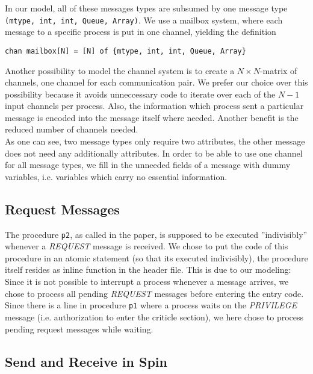 \documentclass{llncs}
\begin{document}
\noindent In our model, all of these messages types are subsumed by one message
type \lstinline|(mtype, int, int, Queue, Array)|. We use a mailbox system,
where each message to a specific process is put in one channel, yielding the definition

\begin{lstlisting}[morekeywords=chan,frame=single]
chan mailbox[N] = [N] of {mtype, int, int, Queue, Array}
\end{lstlisting}
 
Another possibility to model the channel system is to create a $N\times N$-matrix of channels,
one channel for each communication pair. We prefer our choice over this possibility because it
avoids unneccessary code to iterate over each of the $N-1$ input channels per process.
Also, the information which process sent a particular message is encoded into the message itself where needed.
Another benefit is the reduced number of channels needed. \\

As one can see, two message types only require two attributes, the other message does not need any
additionally attributes. In order to be able to use one channel for all message types, we
fill in the unneeded fields of a message with dummy variables, i.e. variables which carry
no essential information.

\subsection{Request Messages}

The procedure \lstinline|p2|, as called in the paper, is supposed to be executed ''indivisibly''
whenever a \emph{REQUEST} message is received. 
We chose to put the code of this procedure in an atomic statement (so that its executed indivisibly),
the procedure  itself resides as inline function in the header file. This is due to our modeling:
Since it is not possible to interrupt a process whenever a message arrives, we chose to process 
all pending \emph{REQUEST} messages before entering the entry code. Since there is a line in procedure \lstinline|p1| where a process waits on the \emph{PRIVILEGE} message (i.e. authorization to enter the
criticle section), we here chose to process pending request messages while waiting.

\subsection{Send and Receive in Spin}
\end{document}
